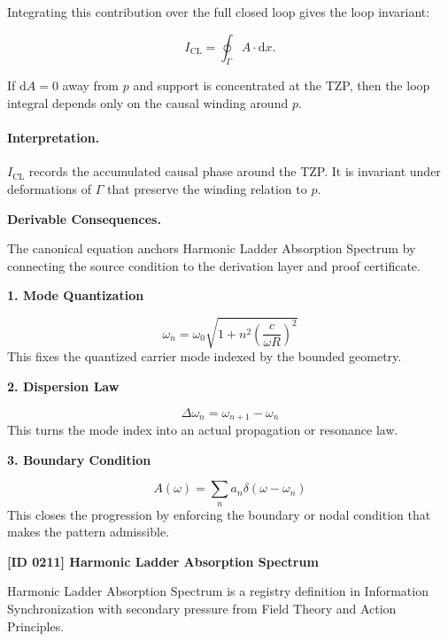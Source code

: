 Integrating this contribution over the full closed loop gives the loop invariant:

\begin{equation}
I_{\mathrm{CL}}
=
\oint_{\Gamma} A\cdot \mathrm{d}x .
\end{equation}

If $\mathrm{d}A=0$ away from $p$ and support is concentrated at the TZP, then the loop integral depends only on the causal winding around $p$.

\paragraph{Interpretation.}
$I_{\mathrm{CL}}$ records the accumulated causal phase around the TZP. It is invariant under deformations of $\Gamma$ that preserve the winding relation to $p$.

\par\vspace{0.35em}
\noindent\textbf{Derivable Consequences.}\quad
\begingroup
\footnotesize
\raggedright
The canonical equation anchors Harmonic Ladder Absorption Spectrum by connecting the source condition to the derivation layer and proof certificate.
\par\endgroup

\noindent\textbf{1. Mode Quantization}\par
\[
\omega_n=\omega_0\sqrt{1+n^2\left(\frac{c}{\omega R}\right)^2}
\]
\noindent This fixes the quantized carrier mode indexed by the bounded geometry.\par
\noindent\textbf{2. Dispersion Law}\par
\[
\Delta\omega_n=\omega_{n+1}-\omega_n
\]
\noindent This turns the mode index into an actual propagation or resonance law.\par
\noindent\textbf{3. Boundary Condition}\par
\[
A(\omega)=\sum_n a_n\delta(\omega-\omega_n)
\]
\noindent This closes the progression by enforcing the boundary or nodal condition that makes the pattern admissible.\par

\clearpage
\noindent\textbf{[ID 0211] Harmonic Ladder Absorption Spectrum}\par
\vspace{0.35em}
\begingroup\small
{}
Harmonic Ladder Absorption Spectrum is a registry definition in Information Synchronization with secondary pressure from Field Theory and Action Principles.

